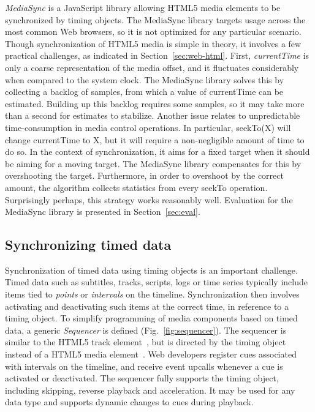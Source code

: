 \documentclass[graybox]{svmult}
\begin{document}
\emph{MediaSync} is a JavaScript library allowing HTML5 media elements to be
synchronized by timing objects. The MediaSync library targets usage across the
most common Web browsers, so it is not optimized for any particular scenario.
Though synchronization of HTML5 media is simple in theory, it involves a few
practical challenges, as indicated in Section~\ref{sec:web-html}. First,
\emph{currentTime} is only a coarse representation of the media offset, and it
fluctuates considerably when compared to the system clock. The MediaSync
library solves this by collecting a backlog of samples, from which a value of
currentTime can be estimated. Building up this backlog requires some samples,
so it may take more than a second for estimates to stabilize. Another issue
relates to unpredictable time-consumption in media control operations. In
particular, seekTo(X) will change currentTime to X, but it will require a non-negligible 
amount of time to do so. In the context of synchronization, it aims
for a fixed target when it should be aiming for a moving target. The MediaSync
library compensates for this by overshooting the target. Furthermore, in order
to overshoot by the correct amount, the algorithm collects statistics from
every seekTo operation. Surprisingly perhaps, this strategy works reasonably
well. Evaluation for the MediaSync library is presented in Section~\ref{sec:eval}.


\subsection{Synchronizing timed data}
\label{sec:sequencer}

Synchronization of timed data using timing objects is an important challenge.
Timed data such as subtitles, tracks, scripts, logs or time series typically
include items tied to \emph{points} or \emph{intervals} on the timeline.
Synchronization then involves activating and deactivating such items at the
correct time, in reference to a timing object. To simplify programming of
media components based on timed data, a generic \emph{Sequencer} is defined 
(Fig.~\ref{fig:sequencer}). The sequencer is similar to the HTML5 track 
element~\cite{html5track}, but is
directed by the timing object instead of a HTML5 media
element~\cite{html5media}. Web developers register cues associated with
intervals on the timeline, and receive event upcalls whenever a cue is
activated or deactivated. The sequencer fully supports the timing object,
including skipping, reverse playback and acceleration. It may be used for any
data type and supports dynamic changes to cues during playback.
\end{document}
